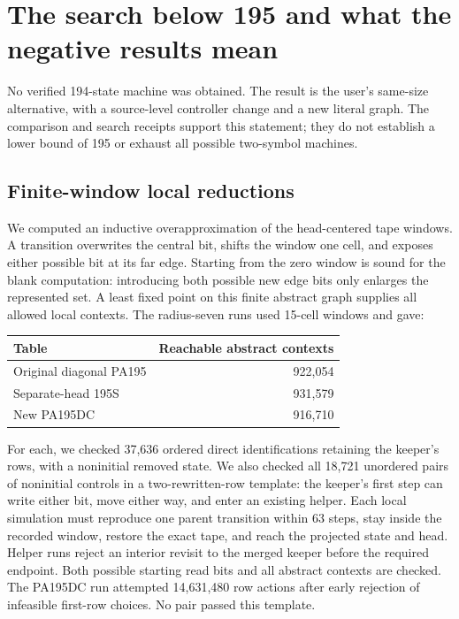 \section{The search below 195 and what the negative results mean}
\label{sec:search}

No verified 194-state machine was obtained. The result is the user's
same-size alternative, with a source-level controller change and a new
literal graph. The comparison and search receipts support this statement;
they do not establish a lower bound of 195 or exhaust all possible
two-symbol machines.

\subsection{Finite-window local reductions}

We computed an inductive overapproximation of the head-centered tape
windows. A transition overwrites the central bit, shifts the window one
cell, and exposes either possible bit at its far edge. Starting from the
zero window is sound for the blank computation: introducing both possible
new edge bits only enlarges the represented set. A least fixed point on
this finite abstract graph supplies all allowed local contexts. The
radius-seven runs used 15-cell windows and gave:

\begin{center}
\begin{tabular}{@{}lr@{}}
\toprule
Table&Reachable abstract contexts\\\midrule
Original diagonal PA195&922,054\\
Separate-head 195S&931,579\\
New PA195DC&916,710\\
\bottomrule
\end{tabular}
\end{center}

For each, we checked 37,636 ordered direct identifications retaining the
keeper's rows, with a noninitial removed state. We also checked all 18,721
unordered pairs of noninitial controls in a two-rewritten-row template:
the keeper's first step can write either bit, move either way, and enter
an existing helper. Each local simulation must reproduce one parent
transition within 63 steps, stay inside the recorded window, restore the
exact tape, and reach the projected state and head. Helper runs reject an
interior revisit to the merged keeper before the required endpoint.
Both possible starting read bits and all abstract contexts are checked.
The PA195DC run attempted 14,631,480 row actions after early rejection of
infeasible first-row choices. No pair passed this template.

